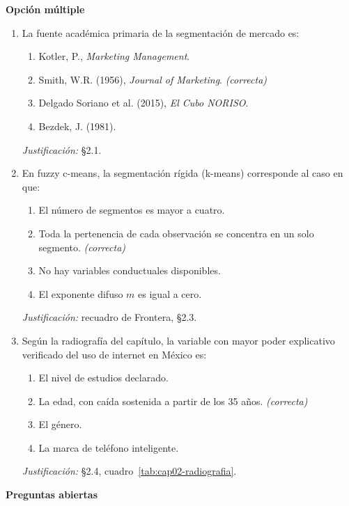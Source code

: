 \textbf{Opción múltiple}

\begin{enumerate}
  \item La fuente académica primaria de la segmentación de mercado es:
  \begin{enumerate}
    \item[a)] Kotler, P., \textit{Marketing Management}.
    \item[b)] Smith, W.R. (1956), \textit{Journal of Marketing}. \textit{(correcta)}
    \item[c)] Delgado Soriano et al. (2015), \textit{El Cubo NORISO}.
    \item[d)] Bezdek, J. (1981).
  \end{enumerate}
  \textit{Justificación:} §2.1.

  \item En fuzzy c-means, la segmentación rígida (k-means) corresponde al
  caso en que:
  \begin{enumerate}
    \item[a)] El número de segmentos es mayor a cuatro.
    \item[b)] Toda la pertenencia de cada observación se concentra en un solo segmento. \textit{(correcta)}
    \item[c)] No hay variables conductuales disponibles.
    \item[d)] El exponente difuso $m$ es igual a cero.
  \end{enumerate}
  \textit{Justificación:} recuadro de Frontera, §2.3.

  \item Según la radiografía del capítulo, la variable con mayor poder
  explicativo verificado del uso de internet en México es:
  \begin{enumerate}
    \item[a)] El nivel de estudios declarado.
    \item[b)] La edad, con caída sostenida a partir de los 35 años. \textit{(correcta)}
    \item[c)] El género.
    \item[d)] La marca de teléfono inteligente.
  \end{enumerate}
  \textit{Justificación:} §2.4, cuadro~\ref{tab:cap02-radiografia}.
\end{enumerate}

\textbf{Preguntas abiertas}

